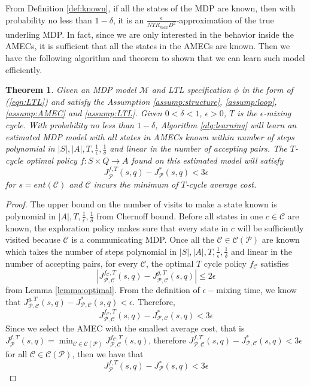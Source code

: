 \documentclass[journal]{IEEEtran}
\newtheorem{theorem}{Theorem}
\begin{document}
From Definition \ref{def:known}, if all the states of the MDP are known, then with probability no less than $1-\delta$, it is an $\frac{\epsilon}{NTR_{max}D^2}$-approximation of the true underling MDP. In fact, since we are only interested in the behavior inside the AMECs, it is sufficient that all the states in the AMECs are known. Then we have the following algorithm and theorem to shown that we can learn such model efficiently.




\begin{theorem}
	Given an MDP model $\mathcal{M}$ and LTL specification $\phi$ in the form of (\ref{eqn:LTL}) and  satisfy the Assumption \ref{assump:structure}, \ref{assump:loop}, \ref{assump:AMEC} and \ref{assump:LTL}. Given $0<\delta<1$, $\epsilon>0$, $T$ is the $\epsilon$-mixing cycle. With probability no less than $1-\delta$, Algorithm \ref{alg:learning} will learn an estimated MDP model with all states in AMECs known within number of steps polynomial in $|S|,|A|,T,\frac{1}{\epsilon},\frac{1}{\delta}$ and linear in the number of accepting pairs. The $T$-cycle optimal policy $f :S\times Q\rightarrow A
	$ found on this estimated model will satisfy 
	$$
	J^{f,T}_{\mathcal{P}}(s,q)-J^{*}_{\mathcal{P}}(s,q)< 3\epsilon 
	$$ for $s=ent(\mathcal{C})$ and $\mathcal{C}$ incurs the minimum of $T$-cycle average cost.
\end{theorem}

\begin{proof}
	The upper bound on the number of visits to make a state known is polynomial in $|A|,T,\frac{1}{\epsilon},\frac{1}{\delta}$ from Chernoff bound. Before all states in one $c\in\mathcal{C}$ are known, the exploration policy makes sure that every state in $c$ will be sufficiently visited because $\mathcal{C}$ is a communicating MDP. Once all the $\mathcal{C}\in\mathcal{C}(\mathcal{P})$ are known which takes the number of steps polynomial in $|S|,|A|,T,\frac{1}{\epsilon},\frac{1}{\delta}$ and linear in the number of accepting pairs, for every $\mathcal{C}$, the optimal $T$ cycle policy $f_\mathcal{C}$  satisfies 
	$$
	|J^{f_\mathcal{C},T}_{\mathcal{P},\mathcal{C}}(s,q)-J^{g,T}_{\mathcal{P},\mathcal{C}}(s,q)|\leq2\epsilon	
	$$ from Lemma \ref{lemma:optimal}. From the definition of $\epsilon-$mixing time, we know that $J^{g,T}_{\mathcal{P},\mathcal{C}}(s,q)-J^*_{\mathcal{P},\mathcal{C}}(s,q)<\epsilon$. Therefore, 
	$$
	J^{f_\mathcal{C},T}_{\mathcal{P},\mathcal{C}}(s,q) - J^*_{\mathcal{P},\mathcal{C}}(s,q)<3\epsilon
	$$
	Since we select the AMEC with the smallest average cost, that is $J^{f,T}_{\mathcal{P}}(s,q)=\min_{\mathcal{C}\in\mathcal{C}(\mathcal{P})}{J^{f_\mathcal{C},T}_{\mathcal{P},\mathcal{C}}(s,q)}$, therefore $J^{f,T}_{\mathcal{P},\mathcal{C}}(s,q) - J^*_{\mathcal{P},\mathcal{C}}(s,q)<3\epsilon$ for all $\mathcal{C}\in\mathcal{C}(\mathcal{P})$, then we have that 
	$$
	J^{f,T}_{\mathcal{P}}(s,q)-J^{*}_{\mathcal{P}}(s,q)< 3\epsilon 
	$$	
\end{proof}
\end{document}
